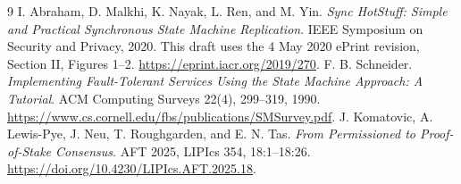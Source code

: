 \documentclass[11pt,a4paper,onecolumn]{article}
\begin{document}
\begin{thebibliography}{9}\small
\setlength{\itemsep}{3pt}
I. Abraham, D. Malkhi, K. Nayak, L. Ren, and M. Yin.
\emph{Sync HotStuff: Simple and Practical Synchronous State Machine Replication}.
IEEE Symposium on Security and Privacy, 2020.
This draft uses the 4 May 2020 ePrint revision, Section II, Figures 1--2.
\url{https://eprint.iacr.org/2019/270}.
F. B. Schneider.
\emph{Implementing Fault-Tolerant Services Using the State Machine Approach:
A Tutorial}. ACM Computing Surveys 22(4), 299--319, 1990.
\url{https://www.cs.cornell.edu/fbs/publications/SMSurvey.pdf}.
J. Komatovic, A. Lewis-Pye, J. Neu, T. Roughgarden, and E. N. Tas.
\emph{From Permissioned to Proof-of-Stake Consensus}.
AFT 2025, LIPIcs 354, 18:1--18:26.
\url{https://doi.org/10.4230/LIPIcs.AFT.2025.18}.
\end{thebibliography}
\end{document}
